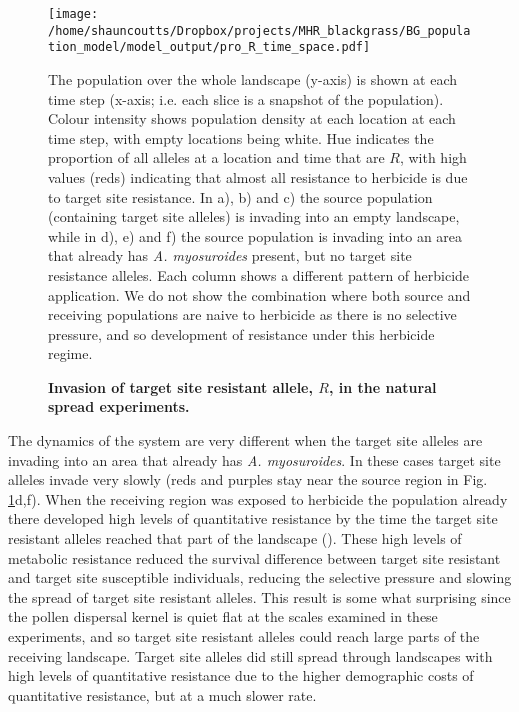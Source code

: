 \documentclass[10pt,letterpaper]{article}
\begin{document}
\begin{figure}[!h] 
	\texttt{[image: /home/shauncoutts/Dropbox/projects/MHR\_blackgrass/BG\_population\_model/model\_output/pro\_R\_time\_space.pdf]}
\caption{\bf Invasion of target site resistant allele, $R$, in the natural spread experiments.} The population over the whole landscape (y-axis) is shown at each time step (x-axis; i.e. each slice is a snapshot of the population).  Colour intensity shows population density at each location at each time step, with empty locations being white. Hue indicates the proportion of all alleles at a location and time that are $R$, with high values (reds) indicating that almost all resistance to herbicide is due to target site resistance. In a), b) and c) the source population (containing target site alleles) is invading into an empty landscape, while in d), e) and f) the source population is invading into an area that already has \textit{A. myosuroides} present, but no target site resistance alleles. Each column shows a different pattern of herbicide application. We do not show the combination where both source and receiving populations are naive to herbicide as there is no selective pressure, and so development of resistance under this herbicide regime.    
\label{fig:pro_R_natspr}
\end{figure}

The dynamics of the system are very different when the target site alleles are invading into an area that already has \textit{A. myosuroides}. In these cases target site alleles invade very slowly (reds and purples stay near the source region in Fig. \ref{fig:pro_R_natspr}d,f). When the receiving region was exposed to herbicide the population already there developed high levels of quantitative resistance by the time the target site resistant alleles reached that part of the landscape (). These high levels of metabolic resistance reduced the survival difference between target site resistant and target site susceptible individuals, reducing the selective pressure and slowing the spread of target site resistant alleles. This result is some what surprising since the pollen dispersal kernel is quiet flat at the scales examined in these experiments, and so target site resistant alleles could reach large parts of the receiving landscape. Target site alleles did still spread through landscapes with high levels of quantitative resistance due to the higher demographic costs of quantitative resistance, but at a much slower rate.    
\end{document}
